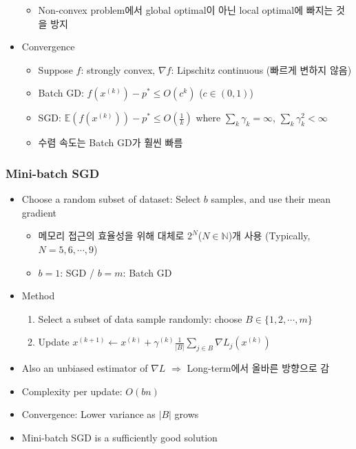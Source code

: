 \begin{itemize}
\begin{itemize}
        \item Non-convex problem에서 global optimal이 아닌 local optimal에 빠지는 것을 방지
    \end{itemize}
    \item Convergence
    \begin{itemize}
        \item Suppose $f$: strongly convex, $\nabla f$: Lipschitz continuous (빠르게 변하지 않음)
        \item Batch GD: $f(x^{(k)})-p^\ast\leq O\left(c^k\right)$ ($c\in(0,1)$)
        \item SGD: $\mathbb{E}(f(x^{(k)}))-p^\ast\leq O\left(\frac{1}{k}\right)$ where $\sum_k\gamma_k=\infty$, $\sum_k\gamma_k^2<\infty$
        \item 수렴 속도는 Batch GD가 훨씬 빠름
    \end{itemize}
\end{itemize}

\subsubsection*{Mini-batch SGD}
\begin{itemize}
    \item Choose a random subset of dataset: Select $b$ samples, and use their mean gradient
    \begin{itemize}
        \item 메모리 접근의 효율성을 위해 대체로 $2^N$($N\in\mathbb{N}$)개 사용 (Typically, $N=5,6,\cdots,9$)
        \item $b=1$: SGD / $b=m$: Batch GD
    \end{itemize}
    \item Method
    \begin{enumerate}
        \item Select a subset of data sample randomly: choose $B\in\{1,2,\cdots,m\}$
        \item Update $x^{(k+1)}\leftarrow x^{(k)}+\gamma^{(k)}\frac{1}{|B|}\sum_{j\in B}\nabla L_j(x^{(k)})$
    \end{enumerate}
    \item Also an unbiased estimator of $\nabla L$ $\Rightarrow$ Long-term에서 올바른 방향으로 감
    \item Complexity per update: $O(bn)$
    \item Convergence: Lower variance as $|B|$ grows
    \item Mini-batch SGD is a sufficiently good solution
\end{itemize}
\begin{figures}
\end{figures}

